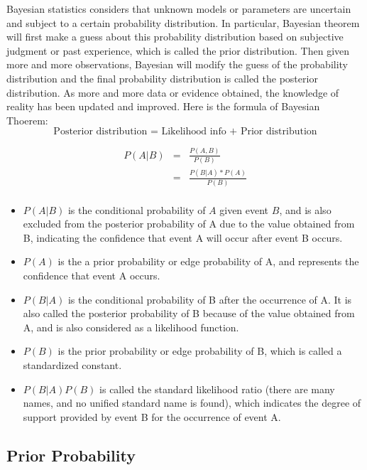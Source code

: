 Bayesian statistics considers that unknown models or parameters are uncertain and subject to a certain probability distribution.
In particular, Bayesian theorem will first make a guess about this probability distribution based on subjective judgment or past experience, which is called the prior distribution. Then given more and more observations, Bayesian will modify the guess of the probability distribution and the final probability distribution is called the posterior distribution. As more and more data or evidence obtained, the knowledge of reality has been updated and improved. Here is the formula of Bayesian Thoerem:
$$ \text{Posterior distribution = Likelihood info + Prior distribution}$$

\begin{eqnarray*}
P(A|B) &=& \frac{P(A,B)}{P(B)} \\
& = &\frac{P(B|A)*P(A)}{P(B)} \\
\end{eqnarray*}
\begin{itemize}
  \item $P(A | B)$ is the conditional probability of $A$ given event $B$, and is also excluded from the posterior probability of A due to the value obtained from B, indicating the confidence that event A will occur after event B occurs.

  \item $P(A)$ is the a prior probability or edge probability of A, and represents the confidence that event A occurs.

  \item $P(B|A)$ is the conditional probability of B after the occurrence of A. It is also called the posterior probability of B because of the value obtained from A, and is also considered as a likelihood function.

  \item $P(B)$ is the prior probability or edge probability of B, which is called a standardized constant.

  \item $P(B | A) P(B)$ is called the standard likelihood ratio (there are many names, and no unified standard name is found), which indicates the degree of support provided by event B for the occurrence of event A.
\end{itemize}
\subsection{Prior Probability}

